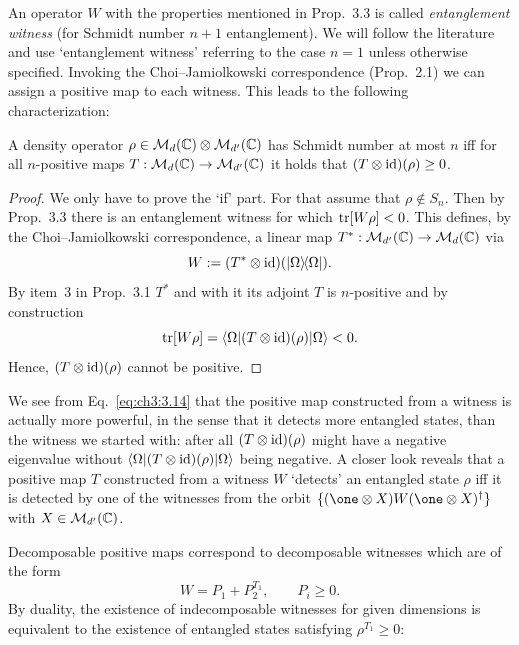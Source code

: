 \documentclass[11pt,a4paper]{article}
\numberwithin{equation}{section}
\begin{document}
An operator $W$ with the properties mentioned in Prop.~3.3 is called \emph{entanglement witness} (for Schmidt number
$n+1$ entanglement). We will follow the literature and use `entanglement witness' referring to the case $n=1$ unless
otherwise specified. Invoking the Choi--Jamiolkowski correspondence (Prop.~2.1) we can assign a positive map to each
witness. This leads to the following characterization:

\begin{proposition}
    A density operator $\rho\in \mathcal{M}_d(\mathbb{C})\otimes \mathcal{M}_{d'}(\mathbb{C})$ has Schmidt number at most $n$ iff for all $n$-positive
    maps $T:\mathcal{M}_d(\mathbb{C})\to \mathcal{M}_{d'}(\mathbb{C})$ it holds that $(T\otimes \mathrm{id})(\rho)\ge 0$.
\end{proposition}

\begin{proof}
    We only have to prove the `if' part. For that assume that $\rho\notin S_n$. Then by Prop.~3.3 there is an entanglement
    witness for which $\operatorname{tr}[W\rho]<0$. This defines, by the Choi--Jamiolkowski correspondence, a linear map
    $T^*:\mathcal{M}_{d'}(\mathbb{C})\to \mathcal{M}_d(\mathbb{C})$ via
    \begin{equation}\label{eq:ch3:3.13}
        W := (T^*\otimes \mathrm{id})(|\Omega\rangle\!\langle\Omega|).
    \end{equation}
    By item~3 in Prop.~3.1 $T^*$ and with it its adjoint $T$ is $n$-positive and by construction
    \begin{equation}\label{eq:ch3:3.14}
        \operatorname{tr}[W\rho] = \langle\Omega|(T\otimes \mathrm{id})(\rho)|\Omega\rangle < 0.
    \end{equation}
    Hence, $(T\otimes \mathrm{id})(\rho)$ cannot be positive.
\end{proof}

We see from Eq.~\eqref{eq:ch3:3.14} that the positive map constructed from a witness is actually more powerful,
in the sense that it detects more entangled states, than the witness we started with: after all $(T\otimes \mathrm{id})(\rho)$
might have a negative eigenvalue without $\langle\Omega|(T\otimes \mathrm{id})(\rho)|\Omega\rangle$ being negative.
A closer look reveals that a positive map $T$ constructed from a witness $W$ `detects' an entangled state $\rho$
iff it is detected by one of the witnesses from the orbit $\{(\one\otimes X)W(\one\otimes X)^\dagger\}$
with $X\in \mathcal{M}_{d'}(\mathbb{C})$.

Decomposable positive maps correspond to decomposable witnesses which are of the form
\begin{equation}\label{eq:ch3:3.15}
    W = P_1 + P_2^{T_1},
    \qquad P_i\ge 0.
\end{equation}
By duality, the existence of indecomposable witnesses for given dimensions is equivalent to the existence of
entangled states satisfying $\rho^{T_1}\ge 0$:
\end{document}
